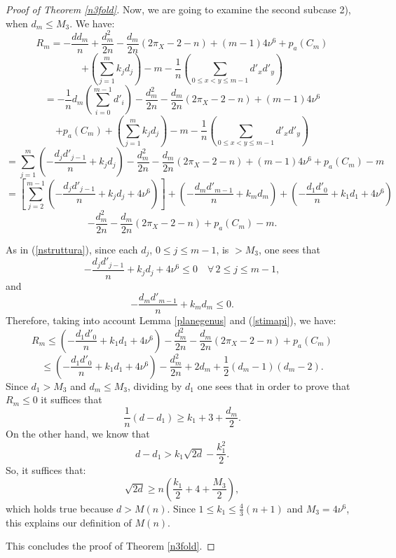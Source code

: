 \documentclass[9pt,a4paper]{amsart}
\theoremstyle{plain}
\theoremstyle{definition}
\theoremstyle{remark}
\begin{document}
\begin{proof}[Proof of Theorem \ref{n3fold}]
\smallskip
Now, we are going to examine the second subcase 2),  when $d_m\leq
M_3$. We have:
$$
R_m=-\frac{dd_m}{n}+\frac{d_m^2}{2n}-\frac{d_m}{2n}(2\pi_X-2-n)+(m-1)4\nu^6+p_a(C_m)
$$
$$
+\left(\sum_{j=1}^{m}k_jd_j\right)-m-\frac{1}{n}\left(\sum_{0\leq
x<y\leq m-1}d'_xd'_y\right)
$$
$$
=-\frac{1}{n}d_m\left(\sum_{i=0}^{m-1}d'_i\right)-\frac{d_m^2}{2n}-\frac{d_m}{2n}(2\pi_X-2-n)+(m-1)4\nu^6
$$
$$
+p_a(C_m)+\left(\sum_{j=1}^{m}k_jd_j\right)-m-\frac{1}{n}\left(\sum_{0\leq
x<y\leq m-1}d'_xd'_y\right)
$$
$$
=\sum_{j=1}^{m}\left(-\frac{d_jd'_{j-1}}{n}+k_jd_j\right)
-\frac{d_m^2}{2n}-\frac{d_m}{2n}(2\pi_X-2-n)+(m-1)4\nu^6 +p_a(C_m)-m
$$
$$
=\left[\sum_{j=2}^{m-1}\left(-\frac{d_jd'_{j-1}}{n}+k_jd_j+4\nu^6\right)\right]+
\left(-\frac{d_md'_{m-1}}{n}+k_md_m\right)+
\left(-\frac{d_1d'_{0}}{n}+k_1d_1+4\nu^6\right)
$$
$$
-\frac{d_m^2}{2n}-\frac{d_m}{2n}(2\pi_X-2-n) +p_a(C_m)-m.
$$

\smallskip
As in (\ref{nstruttura}), since each $d_j$, $0\leq j\leq {m-1}$, is
$>M_3$, one sees that
$$
-\frac{d_jd'_{j-1}}{n}+k_jd_j+4\nu^6\leq 0\quad \forall\, 2\leq
j\leq {m-1},
$$
and
$$
-\frac{d_md'_{m-1}}{n}+k_md_m\leq 0.
$$
Therefore, taking into account Lemma \ref{planegenus} and
(\ref{stimapi}), we have:
$$
R_m\leq
\left(-\frac{d_1d'_{0}}{n}+k_1d_1+4\nu^6\right)-\frac{d_m^2}{2n}-\frac{d_m}{2n}(2\pi_X-2-n)
+p_a(C_m)
$$
$$
\leq
\left(-\frac{d_1d'_{0}}{n}+k_1d_1+4\nu^6\right)-\frac{d_m^2}{2n}+2{d_m}
+\frac{1}{2}(d_m-1)(d_m-2).
$$
Since $d_1>M_3$ and $d_m\leq M_3$, dividing by $d_1$ one sees that
in order to prove that $R_m\leq 0$ it suffices that
$$
\frac{1}{n}(d-d_1)\geq k_1+3+\frac{d_m}{2}.
$$
On the other hand, we know that
$$
d-d_{1}> k_{1}\sqrt{2d}-\frac{k_{1}^2}{2}.
$$
So, it suffices that:
$$
\sqrt{2d}\geq n\left(\frac{k_1}{2}+4+\frac{M_3}{2}\right),
$$
which holds true because  $d>M(n)$. Since $1\leq k_1\leq \frac{4}{3}(n+1)$ and $M_3=4\nu^6$,
this explains our definition of $M(n)$.

\smallskip
This concludes the proof of Theorem \ref{n3fold}.
\end{proof}
\end{document}
